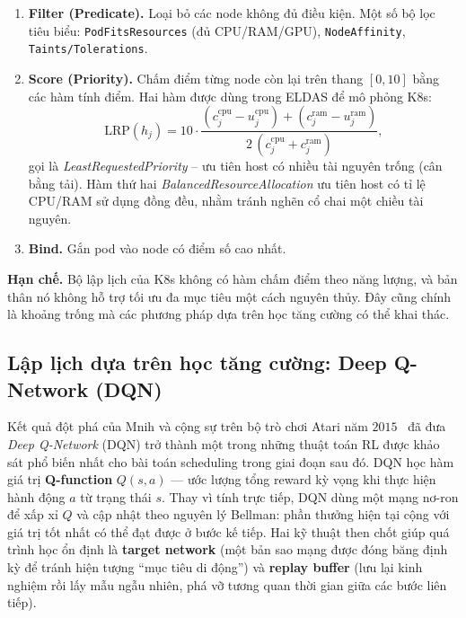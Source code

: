 \begin{enumerate}
  \item \textbf{Filter (Predicate).} Loại bỏ các node không đủ điều kiện. Một
        số bộ lọc tiêu biểu: \texttt{PodFitsResources} (đủ CPU/RAM/GPU),
        \texttt{NodeAffinity}, \texttt{Taints/Tolerations}.
  \item \textbf{Score (Priority).} Chấm điểm từng node còn lại trên thang
        $[0,10]$ bằng các hàm tính điểm. Hai hàm được dùng trong ELDAS để mô
        phỏng K8s:
        \[
          \mathrm{LRP}(h_j) = 10 \cdot
          \frac{(c^{\mathrm{cpu}}_j - u^{\mathrm{cpu}}_j)
              + (c^{\mathrm{ram}}_j - u^{\mathrm{ram}}_j)}
              {2\,(c^{\mathrm{cpu}}_j + c^{\mathrm{ram}}_j)},
        \]
        gọi là \textit{LeastRequestedPriority} -- ưu tiên host có nhiều tài
        nguyên trống (cân bằng tải). Hàm thứ hai
        \textit{BalancedResourceAllocation} ưu tiên host có tỉ lệ CPU/RAM sử
        dụng đồng đều, nhằm tránh nghẽn cổ chai một chiều tài nguyên.
  \item \textbf{Bind.} Gắn pod vào node có điểm số cao nhất.
\end{enumerate}

\textbf{Hạn chế.} Bộ lập lịch của K8s không có hàm chấm điểm theo năng
lượng, và bản thân nó không hỗ trợ tối ưu đa mục tiêu một cách nguyên thủy.
Đây cũng chính là khoảng trống mà các phương pháp dựa trên học tăng cường
có thể khai thác.

\subsection{Lập lịch dựa trên học tăng cường: Deep Q-Network (DQN)}
\label{ssec:dqn}

Kết quả đột phá của Mnih và cộng sự trên bộ trò chơi Atari năm
$2015$~\cite{mnih2015human} đã đưa \textit{Deep Q-Network} (DQN) trở
thành một trong những thuật toán RL được khảo sát phổ biến nhất cho
bài toán scheduling trong giai đoạn sau đó. DQN học hàm giá trị
\textbf{Q-function} $Q(s, a)$ --- ước lượng tổng reward kỳ vọng khi
thực hiện hành động $a$ từ trạng thái $s$. Thay vì tính trực tiếp,
DQN dùng một mạng nơ-ron để xấp xỉ $Q$ và cập nhật theo nguyên lý
Bellman: phần thưởng hiện tại cộng với giá trị tốt nhất có thể đạt
được ở bước kế tiếp. Hai kỹ thuật then chốt giúp quá trình học ổn
định là \textbf{target network} (một bản sao mạng được đóng băng định
kỳ để tránh hiện tượng ``mục tiêu di động'') và \textbf{replay buffer}
(lưu lại kinh nghiệm rồi lấy mẫu ngẫu nhiên, phá vỡ tương quan thời
gian giữa các bước liên tiếp).

